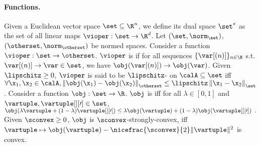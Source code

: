 \paragraph{Functions. }
Given a Euclidean vector space $\set \subseteq \R^n$, we define its dual space $\set^*$ as the set of all linear maps $\vioper: \set \to \R^d$.
Let $(\set, \norm_{\set})$, $(\otherset, \norm_{\otherset})$ be normed spaces. Consider a function $\vioper: \set \to \otherset$. $\vioper$ is  if for all sequences $\{\var[(n)]\}_{n \in \N}$ s.t. $\var[(n)] \to \var \in \set$, we have $\obj(\var[(n)]) \to \obj(\var)$.
Given $\lipschitz \geq 0$, $\vioper$ is said to be $\lipschitz$- on $\calA \subseteq \set$ iff $\forall \x_1, \x_2 \in \calA, \left\| \obj(\x_1) - \obj(\x_2) \right\|_{\otherset} \leq \lipschitz \left\| \x_1 - \x_2 \right\|_{\set}$. 
% 
Consider a function $\obj: \set \to \R$. 
$\obj$ is  iff for all $\lambda \in [0,1]$ and $\vartuple, \vartuple[][\prime] \in  \set$, 
$
\obj (\lambda \vartuple + (1-\lambda) \vartuple[][\prime]) \leq \lambda \obj(\vartuple) + (1-\lambda) \obj(\vartuple[][\prime])  \enspace .
$
Given $\sconvex \geq 0$, $\obj$ is $\sconvex$-strongly-convex, iff $\vartuple \mapsto \obj(\vartuple) - \nicefrac{\sconvex}{2}\| \vartuple\|^2$ is convex.


